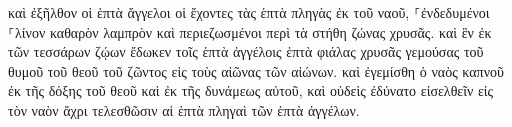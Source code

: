 \documentclass{openreader}
\begin{document}
καὶ ἐξῆλθον οἱ ἑπτὰ ἄγγελοι οἱ ἔχοντες τὰς ἑπτὰ πληγὰς ἐκ τοῦ ναοῦ, ⸀ἐνδεδυμένοι ⸀λίνον καθαρὸν λαμπρὸν καὶ περιεζωσμένοι περὶ τὰ στήθη ζώνας χρυσᾶς. 
καὶ ἓν ἐκ τῶν τεσσάρων ζῴων ἔδωκεν τοῖς ἑπτὰ ἀγγέλοις ἑπτὰ φιάλας χρυσᾶς γεμούσας τοῦ θυμοῦ τοῦ θεοῦ τοῦ ζῶντος εἰς τοὺς αἰῶνας τῶν αἰώνων. 
καὶ ἐγεμίσθη ὁ ναὸς καπνοῦ ἐκ τῆς δόξης τοῦ θεοῦ καὶ ἐκ τῆς δυνάμεως αὐτοῦ, καὶ οὐδεὶς ἐδύνατο εἰσελθεῖν εἰς τὸν ναὸν ἄχρι τελεσθῶσιν αἱ ἑπτὰ πληγαὶ τῶν ἑπτὰ ἀγγέλων. 
\end{document}
